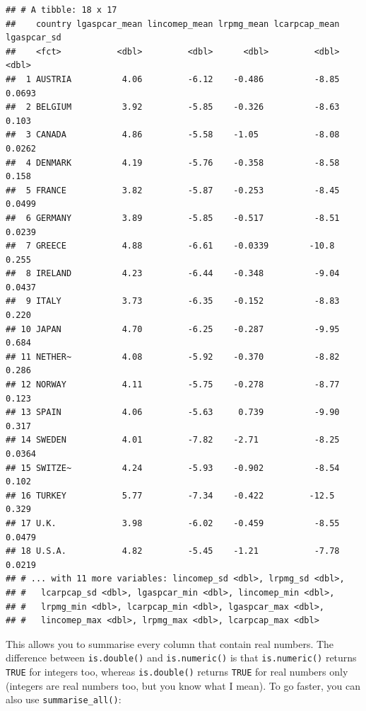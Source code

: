 \documentclass[]{gitbook}
\newenvironment{Shaded}{\begin{snugshade}}{\end{snugshade}}
\newcommand{\KeywordTok}[1]{\textcolor[rgb]{0.13,0.29,0.53}{\textbf{#1}}}
\newcommand{\NormalTok}[1]{#1}
\newcommand{\OperatorTok}[1]{\textcolor[rgb]{0.81,0.36,0.00}{\textbf{#1}}}
\newcommand{\StringTok}[1]{\textcolor[rgb]{0.31,0.60,0.02}{#1}}
\begin{document}
\begin{verbatim}
## # A tibble: 18 x 17
##    country lgaspcar_mean lincomep_mean lrpmg_mean lcarpcap_mean lgaspcar_sd
##    <fct>           <dbl>         <dbl>      <dbl>         <dbl>       <dbl>
##  1 AUSTRIA          4.06         -6.12    -0.486          -8.85      0.0693
##  2 BELGIUM          3.92         -5.85    -0.326          -8.63      0.103 
##  3 CANADA           4.86         -5.58    -1.05           -8.08      0.0262
##  4 DENMARK          4.19         -5.76    -0.358          -8.58      0.158 
##  5 FRANCE           3.82         -5.87    -0.253          -8.45      0.0499
##  6 GERMANY          3.89         -5.85    -0.517          -8.51      0.0239
##  7 GREECE           4.88         -6.61    -0.0339        -10.8       0.255 
##  8 IRELAND          4.23         -6.44    -0.348          -9.04      0.0437
##  9 ITALY            3.73         -6.35    -0.152          -8.83      0.220 
## 10 JAPAN            4.70         -6.25    -0.287          -9.95      0.684 
## 11 NETHER~          4.08         -5.92    -0.370          -8.82      0.286 
## 12 NORWAY           4.11         -5.75    -0.278          -8.77      0.123 
## 13 SPAIN            4.06         -5.63     0.739          -9.90      0.317 
## 14 SWEDEN           4.01         -7.82    -2.71           -8.25      0.0364
## 15 SWITZE~          4.24         -5.93    -0.902          -8.54      0.102 
## 16 TURKEY           5.77         -7.34    -0.422         -12.5       0.329 
## 17 U.K.             3.98         -6.02    -0.459          -8.55      0.0479
## 18 U.S.A.           4.82         -5.45    -1.21           -7.78      0.0219
## # ... with 11 more variables: lincomep_sd <dbl>, lrpmg_sd <dbl>,
## #   lcarpcap_sd <dbl>, lgaspcar_min <dbl>, lincomep_min <dbl>,
## #   lrpmg_min <dbl>, lcarpcap_min <dbl>, lgaspcar_max <dbl>,
## #   lincomep_max <dbl>, lrpmg_max <dbl>, lcarpcap_max <dbl>
\end{verbatim}

This allows you to summarise every column that contain real numbers. The difference between
\texttt{is.double()} and \texttt{is.numeric()} is that \texttt{is.numeric()} returns \texttt{TRUE} for integers too, whereas
\texttt{is.double()} returns \texttt{TRUE} for real numbers only (integers are real numbers too, but you know
what I mean). To go faster, you can also use \texttt{summarise\_all()}:

\begin{Shaded}
\end{Shaded}
\end{document}
